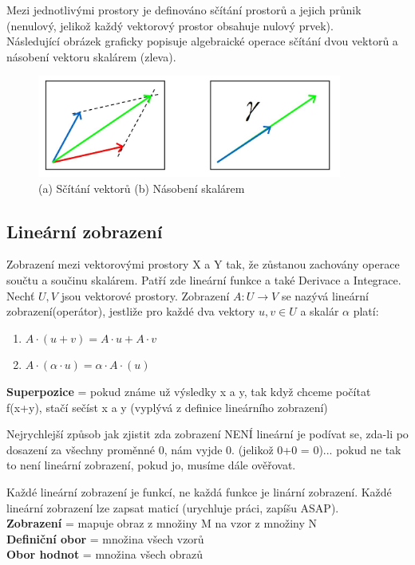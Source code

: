 \documentclass[10pt,a4paper]{article}
\begin{document}
Mezi jednotlivými prostory je definováno sčítání prostorů a jejich průnik (nenulový, jelikož každý vektorový prostor obsahuje nulový prvek).\\
Následující obrázek graficky popisuje algebraické operace sčítání dvou vektorů a násobení vektoru skalárem (zleva).
\begin{figure}[ht]
    \centering
    \includegraphics[width=10cm]{mat_vektory.JPG}
    \caption{(a) Sčítání vektorů (b) Násobení skalárem}
    \label{fig:mat_vektory}
\end{figure}

\subsection{Lineární zobrazení}
Zobrazení mezi vektorovými prostory X a Y tak, že zůstanou zachovány operace součtu a součinu skalárem. Patří zde lineární funkce a také Derivace a Integrace.\\
Nechť $U, V$ jsou vektorové prostory. Zobrazení $A:U\rightarrow V$ se nazývá lineární zobrazení(operátor), jestliže pro každé dva vektory $u,v \in U$ a skalár $\alpha$ platí:
\begin{enumerate}
    \item $A \cdot (u+v) = A\cdot u + A\cdot v$
    \item $A\cdot (\alpha \cdot u) = \alpha \cdot A \cdot (u)$ 
\end{enumerate}
\textbf{Superpozice} = pokud známe už výsledky x a y, tak když chceme počítat f(x+y), stačí sečíst x a y (vyplývá z definice lineárního zobrazení)\par
Nejrychlejší způsob jak zjistit zda zobrazení NENÍ lineární je podívat se, zda-li po dosazení za všechny proměnné 0, nám vyjde 0. (jelikož 0+0 = 0)... pokud ne tak to není lineární zobrazení, pokud jo, musíme dále ověřovat.\par
Každé lineární zobrazení je funkcí, ne každá funkce je linární zobrazení. Každé lineární zobrazení lze zapsat maticí (urychluje práci, zapíšu ASAP).\\
\textbf{Zobrazení} = mapuje obraz z množiny M na vzor z množiny N\\
\textbf{Definiční obor} = množina všech vzorů\\
\textbf{Obor hodnot} = množina všech obrazů
\end{document}
